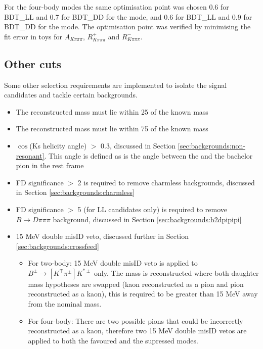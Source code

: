 For the four-body modes the same optimisation point was chosen 0.6 for BDT\_LL and 0.7 for BDT\_DD for the \decay{\Dz}{\Kp\pim\pip\pim} \decay{\Dz}{\pi\pi\pi\pi} mode, and 0.6 for BDT\_LL and 0.9 for BDT\_DD for the \decay{\Dz}{\Kp\pim\pip\pim} mode. The optimisation point was verified by minimising the fit error in toys for $A_{K\pi\pi\pi}$, $R^+_{K\pi\pi\pi}$ and $R^-_{K\pi\pi\pi}$.


\subsection{Other cuts}

Some other selection requirements are implemented to isolate the signal candidates and tackle certain backgrounds.

\begin{itemize}
\item The reconstructed \Dz mass must lie within 25 \mev of the known \Dz mass
\item The reconstructed \Kstarm mass must lie within 75 \mev of the known \Kstarp mass
\item{\textbar $\cos$(Ks helicity angle) \textbar $>$ 0.3, discussed in Section \ref{sec:backgrounds:non-resonant}. This angle is defined as is the angle between the \KS and the bachelor pion in the \Kstarm rest frame}
\item{\Dz FD significance $>$ 2 is required to remove charmless backgrounds, discussed in Section \ref{sec:backgrounds:charmless}}
\item{\KS FD significance $>$ 5 (for LL candidates only) is required to remove $B \to D\pi\pi\pi$ background, discussed in Section \ref{sec:backgrounds:b2dpipipi}}
\item{15 MeV double misID veto, discussed further in Section \ref{sec:backgrounds:crossfeed}}
\begin{itemize}
\item For two-body: 15 MeV double misID veto is applied to $B^{\pm} \to [K^{\mp}\pi^{\pm}] K^{*\pm}$ only. The \Dz mass is reconstructed where both daughter mass hypotheses are swapped (kaon reconstructed as a pion and pion reconstructed as a kaon), this is required to be greater than 15 MeV away from the nominal \Dz mass.
\item For four-body: There are two possible pions that could be incorrectly reconstructed as a kaon, therefore two 15 MeV double misID vetos are applied to both the favoured and the supressed modes. 
\end{itemize} 
\end{itemize}


